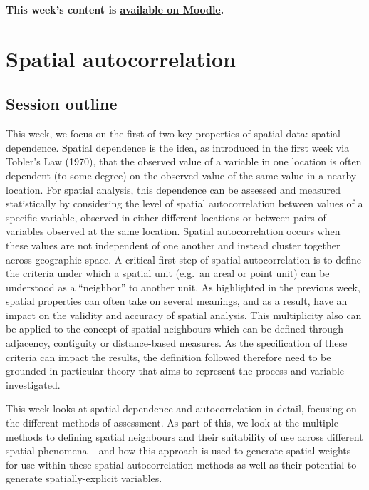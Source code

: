 \documentclass[
]{book}
\begin{document}
\textbf{This week's content is \href{https://moodle.ucl.ac.uk/}{available on Moodle}.}

\hypertarget{spatial-autocorrelation}{%
\chapter{Spatial autocorrelation}\label{spatial-autocorrelation}}

\hypertarget{session-outline}{%
\section{Session outline}\label{session-outline}}

This week, we focus on the first of two key properties of spatial data: spatial dependence. Spatial dependence is the idea, as introduced in the first week via Tobler's Law (1970), that the observed value of a variable in one location is often dependent (to some degree) on the observed value of the same value in a nearby location. For spatial analysis, this dependence can be assessed and measured statistically by considering the level of spatial autocorrelation between values of a specific variable, observed in either different locations or between pairs of variables observed at the same location. Spatial autocorrelation occurs when these values are not independent of one another and instead cluster together across geographic space. A critical first step of spatial autocorrelation is to define the criteria under which a spatial unit (e.g.~an areal or point unit) can be understood as a ``neighbor'' to another unit. As highlighted in the previous week, spatial properties can often take on several meanings, and as a result, have an impact on the validity and accuracy of spatial analysis. This multiplicity also can be applied to the concept of spatial neighbours which can be defined through adjacency, contiguity or distance-based measures. As the specification of these criteria can impact the results, the definition followed therefore need to be grounded in particular theory that aims to represent the process and variable investigated.

This week looks at spatial dependence and autocorrelation in detail, focusing on the different methods of assessment. As part of this, we look at the multiple methods to defining spatial neighbours and their suitability of use across different spatial phenomena -- and how this approach is used to generate spatial weights for use within these spatial autocorrelation methods as well as their potential to generate spatially-explicit variables.
\end{document}
